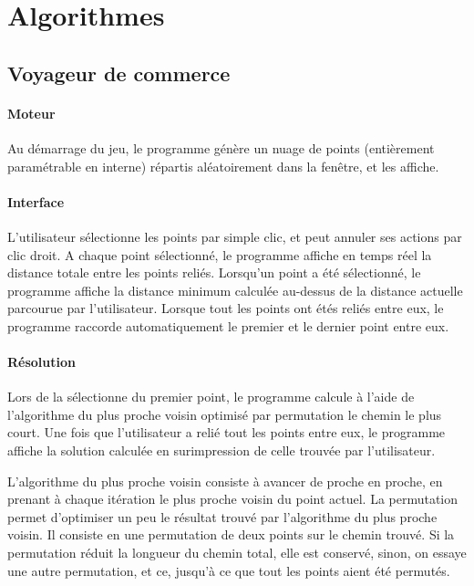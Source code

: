 \section{Algorithmes}
    \subsection{Voyageur de commerce}
        \paragraph{Moteur}
            Au démarrage du jeu, le programme génère un nuage
            de points (entièrement paramétrable en interne)
            répartis aléatoirement dans la fenêtre, et les affiche.
        \paragraph{Interface}
            L'utilisateur sélectionne les points par simple clic,
            et peut annuler ses actions par clic droit.
            A chaque point sélectionné, le programme
            affiche en temps réel la distance totale entre
            les points reliés.
            Lorsqu'un point a été sélectionné, le programme
            affiche la distance minimum calculée au-dessus de
            la distance actuelle parcourue par l'utilisateur.
            Lorsque tout les points ont étés reliés entre eux,
            le programme raccorde automatiquement le premier
            et le dernier point entre eux.
        \paragraph{Résolution}
            Lors de la sélectionne du premier point,
            le programme calcule à l'aide de l'algorithme
            du plus proche voisin optimisé par permutation
            le chemin le plus court.
            Une fois que l'utilisateur a relié tout les points
            entre eux, le programme affiche la solution calculée
            en surimpression de celle trouvée par l'utilisateur.

            L'algorithme du plus proche voisin consiste à avancer
            de proche en proche, en prenant à chaque itération le plus
            proche voisin du point actuel.
            La permutation permet d'optimiser un peu le résultat trouvé
            par l'algorithme du plus proche voisin.
            Il consiste en une permutation de deux points sur le chemin trouvé.
            Si la permutation réduit la longueur du chemin total,
            elle est conservé, sinon, on essaye une autre permutation,
            et ce, jusqu'à ce que tout les points aient été permutés.

